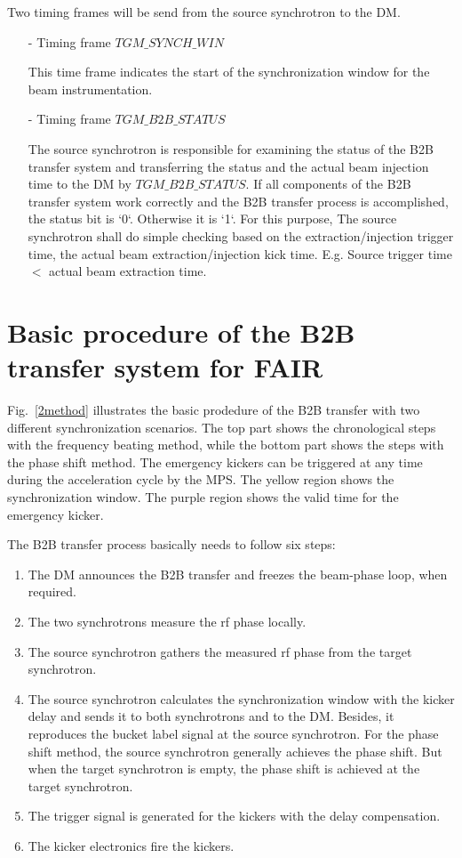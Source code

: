 Two timing frames will be send from the source synchrotron to the DM.
\begin{itemize}
\item[-] Timing frame $TGM\_SYNCH\_WIN$

This time frame indicates the start of the synchronization window for the beam instrumentation.

\item[-] Timing frame $TGM\_B2B\_STATUS$

The source synchrotron is responsible for examining the status of the B2B transfer system and transferring the status and the actual beam injection time to the DM by $TGM\_B2B\_STATUS$. If all components of the B2B transfer system work correctly and the B2B transfer process is accomplished, the status bit is `0`. Otherwise it is `1`. For this purpose, The source synchrotron shall do simple checking based on the extraction/injection trigger time, the actual beam extraction/injection kick time. E.g. Source trigger time $<$ actual beam extraction time.
\end{itemize}

\section{Basic procedure of the B2B transfer system for FAIR}
Fig.~\ref{2method} illustrates the basic prodedure of the B2B transfer with two different synchronization scenarios. The top part shows the chronological steps with the frequency beating method, while the bottom part shows the steps with the phase shift method. The emergency kickers can be triggered at any time during the acceleration cycle by the MPS. The yellow region shows the synchronization window. The purple region shows the valid time for the emergency kicker. 

The B2B transfer process basically needs to follow six steps:
\begin{enumerate}
\item The DM announces the B2B transfer and freezes the beam-phase loop, when required.
\item The two synchrotrons measure the rf phase locally.
\item The source synchrotron gathers the measured rf phase from the target synchrotron.
\item The source synchrotron calculates the synchronization window with the kicker delay and sends it to both synchrotrons and to the DM. Besides, it reproduces the bucket label signal at the source synchrotron.
For the phase shift method, the source synchrotron generally achieves the phase shift. But when the target synchrotron is empty, the phase shift is achieved at the target synchrotron.
\item The trigger signal is generated for the kickers with the delay compensation.
\item The kicker electronics fire the kickers.
\end{enumerate}

